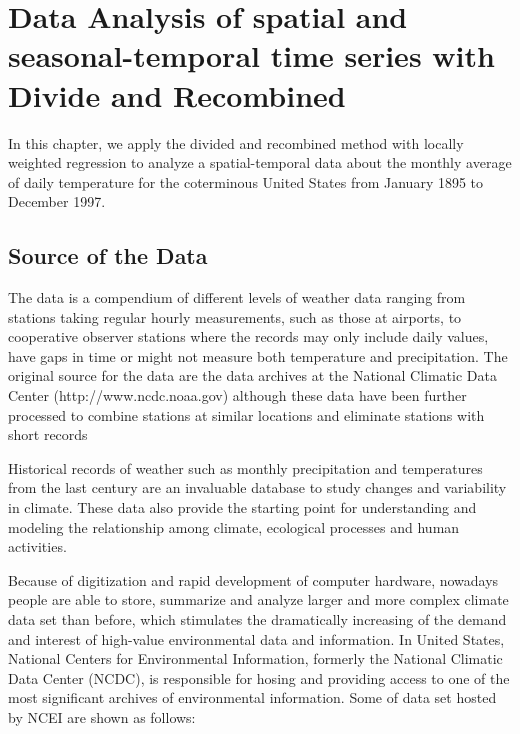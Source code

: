 \chapter{Data Analysis of spatial and seasonal-temporal time series with 
Divide and Recombined}

In this chapter, we apply the divided and recombined method with locally weighted
regression to analyze a spatial-temporal data about the monthly average of daily
temperature for the coterminous United States from January 1895 to December 1997.

\section{Source of the Data}

The data is a compendium of different levels of weather data ranging from stations
taking regular hourly measurements, such as those at airports, to cooperative 
observer stations where the records may only include daily values, have gaps in 
time or might not measure both temperature and precipitation. The original source
for the data are the data archives at the National Climatic Data Center 
(http://www.ncdc.noaa.gov) although these data have been further processed to 
combine stations at similar locations and eliminate stations with short records

Historical records of weather such as monthly precipitation and temperatures from 
the last century are an invaluable database to study changes and variability in 
climate. These data also provide the starting point for understanding and modeling 
the relationship among climate, ecological processes and human activities. 

Because of digitization and rapid development of computer hardware, nowadays
people are able to store, summarize and analyze larger and more 
complex climate data set than before, which stimulates the dramatically 
increasing  of the demand and interest of high-value environmental data and 
information. In United States, National Centers for Environmental Information, 
formerly the National Climatic Data Center (NCDC), is responsible for hosing and 
providing access to one of the most significant archives of environmental 
information. Some of data set hosted by NCEI \cite{NCEI} are shown as follows:

